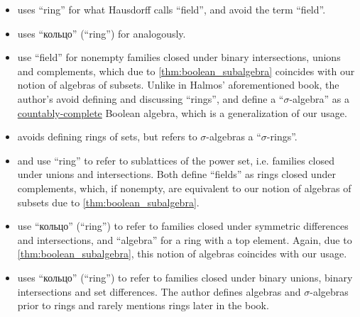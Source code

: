 \begin{remark}
\begin{itemize}
    \item {} uses \enquote{ring} for what Hausdorff calls \enquote{field}, and avoid the term \enquote{field}.

    \item {} uses \enquote{кольцо} (\enquote{ring}) for analogously.

    \item {} use \enquote{field} for nonempty families closed under binary intersections, unions and complements, which due to \cref{thm:boolean_subalgebra} coincides with our notion of algebras of subsets. Unlike in Halmos' aforementioned book, the author's avoid defining and discussing \enquote{rings}, and define a \enquote{\( \sigma \)-algebra} as a \hyperref[def:countably_complete_lattice]{countably-complete} Boolean algebra, which is a generalization of our usage.

    \item {} avoids defining rings of sets, but refers to \( \sigma \)-algebras a \enquote{\( \sigma \)-rings}.

    \item {} and  use \enquote{ring} to refer to sublattices of the power set, i.e. families closed under unions and intersections. Both define \enquote{fields} as rings closed under complements, which, if nonempty, are equivalent to our notion of algebras of subsets due to \cref{thm:boolean_subalgebra}.

    \item {} use \enquote{кольцо} (\enquote{ring}) to refer to families closed under symmetric differences and intersections, and \enquote{algebra} for a ring with a top element. Again, due to \cref{thm:boolean_subalgebra}, this notion of algebras coincides with our usage.

    \item {} uses \enquote{кольцо} (\enquote{ring}) to refer to families closed under binary unions, binary intersections and set differences. The author defines algebras and \( \sigma \)-algebras prior to rings and rarely mentions rings later in the book.
  \end{itemize}
\end{remark}
